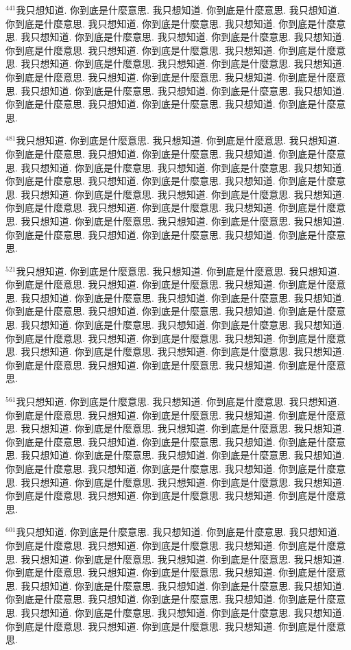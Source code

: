 \documentclass{book}
\begin{document}
$^{441}$我只想知道.
你到底是什麼意思.
我只想知道.
你到底是什麼意思.
我只想知道.
你到底是什麼意思.
我只想知道.
你到底是什麼意思.
我只想知道.
你到底是什麼意思.
我只想知道.
你到底是什麼意思.
我只想知道.
你到底是什麼意思.
我只想知道.
你到底是什麼意思.
我只想知道.
你到底是什麼意思.
我只想知道.
你到底是什麼意思.
我只想知道.
你到底是什麼意思.
我只想知道.
你到底是什麼意思.
我只想知道.
你到底是什麼意思.
我只想知道.
你到底是什麼意思.
我只想知道.
你到底是什麼意思.
我只想知道.
你到底是什麼意思.
我只想知道.
你到底是什麼意思.
我只想知道.
你到底是什麼意思.
我只想知道.
你到底是什麼意思.
我只想知道.
你到底是什麼意思.

$^{481}$我只想知道.
你到底是什麼意思.
我只想知道.
你到底是什麼意思.
我只想知道.
你到底是什麼意思.
我只想知道.
你到底是什麼意思.
我只想知道.
你到底是什麼意思.
我只想知道.
你到底是什麼意思.
我只想知道.
你到底是什麼意思.
我只想知道.
你到底是什麼意思.
我只想知道.
你到底是什麼意思.
我只想知道.
你到底是什麼意思.
我只想知道.
你到底是什麼意思.
我只想知道.
你到底是什麼意思.
我只想知道.
你到底是什麼意思.
我只想知道.
你到底是什麼意思.
我只想知道.
你到底是什麼意思.
我只想知道.
你到底是什麼意思.
我只想知道.
你到底是什麼意思.
我只想知道.
你到底是什麼意思.
我只想知道.
你到底是什麼意思.
我只想知道.
你到底是什麼意思.

$^{521}$我只想知道.
你到底是什麼意思.
我只想知道.
你到底是什麼意思.
我只想知道.
你到底是什麼意思.
我只想知道.
你到底是什麼意思.
我只想知道.
你到底是什麼意思.
我只想知道.
你到底是什麼意思.
我只想知道.
你到底是什麼意思.
我只想知道.
你到底是什麼意思.
我只想知道.
你到底是什麼意思.
我只想知道.
你到底是什麼意思.
我只想知道.
你到底是什麼意思.
我只想知道.
你到底是什麼意思.
我只想知道.
你到底是什麼意思.
我只想知道.
你到底是什麼意思.
我只想知道.
你到底是什麼意思.
我只想知道.
你到底是什麼意思.
我只想知道.
你到底是什麼意思.
我只想知道.
你到底是什麼意思.
我只想知道.
你到底是什麼意思.
我只想知道.
你到底是什麼意思.

$^{561}$我只想知道.
你到底是什麼意思.
我只想知道.
你到底是什麼意思.
我只想知道.
你到底是什麼意思.
我只想知道.
你到底是什麼意思.
我只想知道.
你到底是什麼意思.
我只想知道.
你到底是什麼意思.
我只想知道.
你到底是什麼意思.
我只想知道.
你到底是什麼意思.
我只想知道.
你到底是什麼意思.
我只想知道.
你到底是什麼意思.
我只想知道.
你到底是什麼意思.
我只想知道.
你到底是什麼意思.
我只想知道.
你到底是什麼意思.
我只想知道.
你到底是什麼意思.
我只想知道.
你到底是什麼意思.
我只想知道.
你到底是什麼意思.
我只想知道.
你到底是什麼意思.
我只想知道.
你到底是什麼意思.
我只想知道.
你到底是什麼意思.
我只想知道.
你到底是什麼意思.

$^{601}$我只想知道.
你到底是什麼意思.
我只想知道.
你到底是什麼意思.
我只想知道.
你到底是什麼意思.
我只想知道.
你到底是什麼意思.
我只想知道.
你到底是什麼意思.
我只想知道.
你到底是什麼意思.
我只想知道.
你到底是什麼意思.
我只想知道.
你到底是什麼意思.
我只想知道.
你到底是什麼意思.
我只想知道.
你到底是什麼意思.
我只想知道.
你到底是什麼意思.
我只想知道.
你到底是什麼意思.
我只想知道.
你到底是什麼意思.
我只想知道.
你到底是什麼意思.
我只想知道.
你到底是什麼意思.
我只想知道.
你到底是什麼意思.
我只想知道.
你到底是什麼意思.
我只想知道.
你到底是什麼意思.
我只想知道.
你到底是什麼意思.
我只想知道.
你到底是什麼意思.
\end{document}
